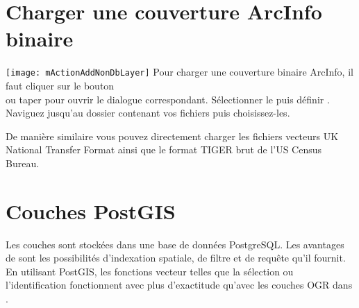 \section{Charger une couverture ArcInfo binaire}


\texttt{[image: mActionAddNonDbLayer]} Pour charger une couverture 
binaire ArcInfo, il faut cliquer sur le bouton\\ 
 ou taper 
 pour ouvrir le dialogue correspondant. Sélectionner le 
 puis définir . Naviguez jusqu'au dossier contenant vos fichiers puis choisissez-les.

De manière similaire vous pouvez directement charger les fichiers vecteurs UK 
National Transfer Format ainsi que le format TIGER brut de l'US Census Bureau.

\section{Couches PostGIS}
\label{label_postgis}

Les couches \pg sont stockées dans une base de données PostgreSQL. Les avantages 
de \pg sont les possibilités d'indexation spatiale, de filtre et de requête 
qu'il fournit. En utilisant PostGIS, les fonctions vecteur telles que la 
sélection ou l'identification fonctionnent avec plus d'exactitude qu'avec les 
couches OGR dans \qg.

